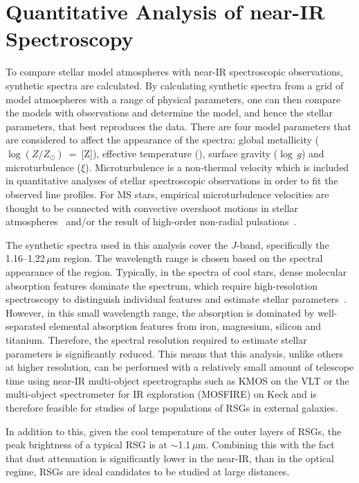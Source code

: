 
\section{Quantitative Analysis of near-IR Spectroscopy} %
\label{sec:model_grid}

To compare stellar model atmospheres with near-IR spectroscopic observations, synthetic spectra are calculated.
By calculating synthetic spectra from a grid of model atmospheres with a range of physical parameters, one can then compare the models with observations and determine the model, and hence the stellar parameters, that best reproduces the data.
There are four model parameters that are considered to affect the appearance of the spectra:
global metallicity ($\log (Z/Z_{\odot})$~=~[Z]), effective temperature (\Teff), surface gravity ($\log\,g$) and microturbulence ($\xi$).
Microturbulence is a non-thermal velocity which is included in quantitative analyses of stellar spectroscopic observations in order to fit the observed line profiles.
For MS stars, empirical microturbulence velocities are thought to be connected with convective overshoot motions in stellar atmospheres~\citep{2009A&A...499..279C} and/or the result of high-order non-radial pulsations~\cite[e.g.][]{2015ApJ...806L..33A}.


The synthetic spectra used in this analysis cover the $J$-band, specifically the
1.16--1.22\,$\mu$m region.
The wavelength range is chosen based on the spectral appearance of the region.
Typically, in the spectra of cool stars, dense molecular absorption features dominate the spectrum, which require high-resolution spectroscopy to distinguish individual features and estimate stellar parameters~\citep[e.g.][]{Cunha07, Davies09a, Davies09b}.
However, in this small wavelength range, the absorption is dominated by well-separated elemental absorption features from iron, magnesium, silicon and titanium.
Therefore, the spectral resolution required to estimate stellar parameters is significantly reduced.
This means that this analysis, unlike others at higher resolution, can be performed with a relatively small amount of telescope time using near-IR multi-object spectrographs such as KMOS on the VLT
or the multi-object spectrometer for IR exploration (MOSFIRE) on Keck and is therefore feasible for studies of large populations of RSGs in external galaxies.

In addition to this, given the cool temperature of the outer layers of RSGs,
the peak brightness of a typical RSG is at $\sim$1.1\,$\mu$m.
Combining this with the fact that dust attenuation is significantly lower in the near-IR, than in the optical regime, RSGs are ideal candidates to be studied at large distances.

